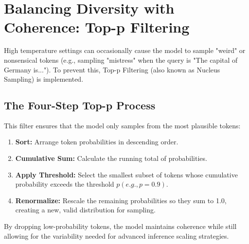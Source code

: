 \section{Balancing Diversity with Coherence: Top-p Filtering}
\label{sec:top-p-filtering}


High temperature settings can occasionally cause the model to sample "weird" or nonsensical tokens (e.g., sampling "mistress" when the query is "The capital of Germany is..."). To prevent this, Top-p Filtering (also known as Nucleus Sampling) is implemented.

\subsection{The Four-Step Top-p Process}

This filter ensures that the model only samples from the most plausible tokens:

\begin{enumerate}
    \item \textbf{Sort:} Arrange token probabilities in descending order.
    \item \textbf{Cumulative Sum:} Calculate the running total of probabilities.
    \item \textbf{Apply Threshold:} Select the smallest subset of tokens whose cumulative probability exceeds the threshold $p (e.g., p=0.9)$.
    \item \textbf{Renormalize:} Rescale the remaining probabilities so they sum to 1.0, creating a new, valid distribution for sampling.
\end{enumerate}

By dropping low-probability tokens, the model maintains coherence while still allowing for the variability needed for advanced inference scaling strategies.